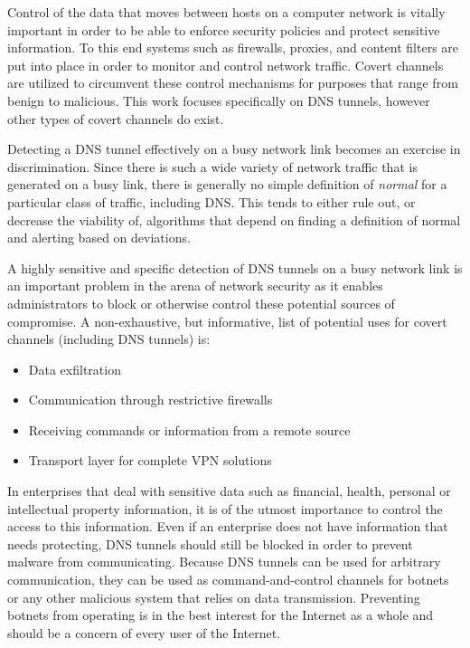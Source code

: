 \documentclass[12pt]{report}
\theoremstyle{remark}
\theoremstyle{definition}
\theoremstyle{definition}
\theoremstyle{definition}
\begin{document}
Control of the data that moves between hosts on a computer network is vitally
important in order to be able to enforce security policies and protect sensitive
information. To this end systems such as firewalls, proxies, and content filters
are put into place in order to monitor and control network traffic. Covert
channels are utilized to circumvent these control mechanisms for purposes that
range from benign\cite{sans-dnshash} to malicious. This work focuses
specifically on DNS tunnels, however other types of covert channels do exist.

Detecting a DNS tunnel effectively on a busy network link becomes an exercise in
discrimination. Since there is such a wide variety of network traffic that is
generated on a busy link, there is generally no simple definition of
\emph{normal} for a particular class of traffic, including DNS. This tends to
either rule out, or decrease the viability of, algorithms that depend on finding
a definition of normal and alerting based on deviations.

A highly sensitive and specific detection of DNS tunnels on a busy network link
is an important problem in the arena of network security as it enables
administrators to block or otherwise control these potential sources of
compromise. A non-exhaustive, but informative, list of potential uses for covert
channels (including DNS tunnels) is:

\begin{itemize} \item Data exfiltration \item Communication through restrictive
firewalls \item Receiving commands or information from a remote source \item
Transport layer for complete VPN solutions \end{itemize}

In enterprises that deal with sensitive data such as financial, health, personal
or intellectual property information, it is of the utmost importance to control
the access to this information. Even if an enterprise does not have information
that needs protecting, DNS tunnels should still be blocked in order to prevent
malware from communicating\cite{Dietrich2011}. Because DNS tunnels can be used
for arbitrary communication, they can be used as command-and-control channels
for botnets\cite{WoframlAlpha-Botnet} or any other malicious system that relies
on data transmission. Preventing botnets from operating is in the best interest
for the Internet as a whole and should be a concern of every user of the
Internet.
\end{document}
